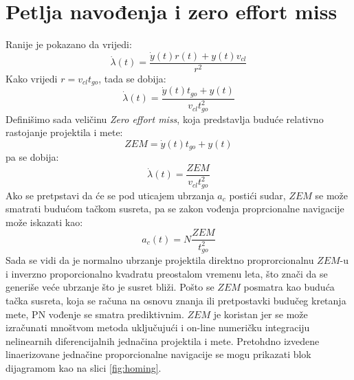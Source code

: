\section{Petlja navođenja i zero effort miss}
Ranije je pokazano da vrijedi:
\begin{equation}
    \dot{\lambda}(t)=\frac{\dot{y}(t)r(t)+y(t)v_{cl}}{r^2}
\end{equation}
Kako vrijedi $r=v_{cl}t_{go}$, tada se dobija:
\begin{equation}
    \dot{\lambda}(t)=\frac{\dot{y}(t)t_{go}+y(t)}{v_{cl}t_{go}^2}
\end{equation}
Definišimo sada veličinu \textit{Zero effort miss}, koja predstavlja buduće relativno rastojanje projektila i mete:
\begin{equation}
    ZEM=\dot{y}(t)t_{go}+y(t)
\end{equation}
pa se dobija:
\begin{equation}
    \dot{\lambda}(t)=\frac{ZEM}{v_{cl}t_{go}^2}
\end{equation}
Ako se pretpstavi da će se pod uticajem ubrzanja $a_c$ postići sudar, $ZEM$ se može smatrati 
budućom tačkom susreta, pa se zakon vođenja proprcionalne navigacije može iskazati kao:
\begin{equation}
    a_c(t)=N\frac{ZEM}{t_{go}^2}
\end{equation}
Sada se vidi da je normalno ubrzanje projektila direktno proprorcionalnu $ZEM$-u i inverzno proporcionalno
kvadratu preostalom vremenu leta, što znači da se generiše veće ubrzanje što je susret bliži.
Pošto se $ZEM$ posmatra kao buduća tačka susreta, koja se računa na osnovu znanja ili pretpostavki 
budučeg kretanja mete, PN vođenje se smatra prediktivnim. $ZEM$ je koristan jer se može izračunati 
mnoštvom metoda uključujući i on-line numeričku integraciju nelinearnih diferencijalnih jednačina projektila 
i mete. Pretohdno izvedene linaerizovane jednačine proporcionalne navigacije se mogu 
prikazati blok dijagramom kao na slici \ref{fig:homing}.
